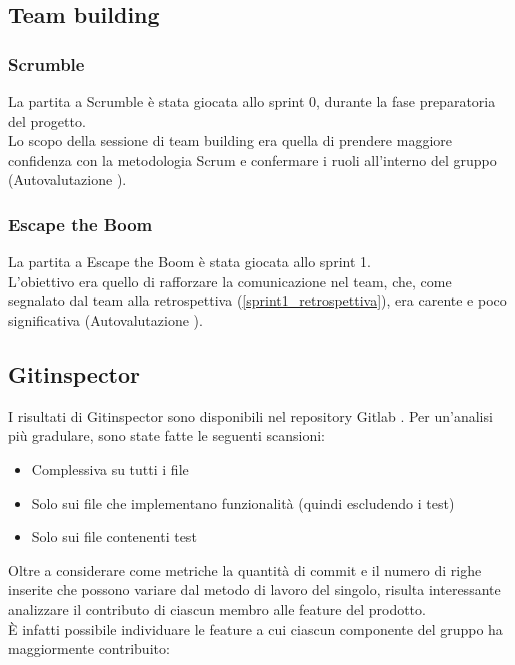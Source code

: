 \documentclass[11pt]{article}
\newcommand{\fref}[1]{\hyperref[#1]{\cref{#1}}}
\begin{document}
\subsection{Team building}
\subsubsection{Scrumble}
La partita a Scrumble è stata giocata allo sprint 0, durante la fase preparatoria del progetto.\\
Lo scopo della sessione di team building era quella di prendere maggiore confidenza con la metodologia Scrum e 
confermare i ruoli all'interno del gruppo (Autovalutazione \cite{gqm_scrumble}).

\subsubsection{Escape the Boom}
La partita a Escape the Boom è stata giocata allo sprint 1.\\
L'obiettivo era quello di rafforzare la comunicazione nel team, che, come segnalato dal team alla retrospettiva (\fref{sprint1_retrospettiva}),
era carente e poco significativa (Autovalutazione \cite{gqm_escapetheboom}).


\subsection{Gitinspector}
I risultati di Gitinspector sono disponibili nel repository Gitlab \cite{gitinspector}. 
Per un'analisi più gradulare, sono state fatte le seguenti scansioni:
\begin{itemize}
    \item Complessiva su tutti i file
    \item Solo sui file che implementano funzionalità (quindi escludendo i test)
    \item Solo sui file contenenti test
\end{itemize}

Oltre a considerare come metriche la quantità di commit e il numero di righe inserite che possono variare dal metodo di lavoro del singolo,
risulta interessante analizzare il contributo di ciascun membro alle feature del prodotto.\\
È infatti possibile individuare le feature a cui ciascun componente del gruppo ha maggiormente contribuito:

\end{document}
